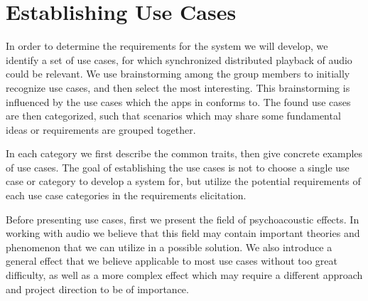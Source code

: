 \chapter{Establishing Use Cases}
\label{cha:establishing_use_cases}
In order to determine the requirements for the system we will develop, we identify a set of use cases, for which synchronized distributed playback of audio could be relevant.
We use brainstorming among the group members to initially recognize use cases, and then select the most interesting.
This brainstorming is influenced by the use cases which the apps in  conforms to.
The found use cases are then categorized, such that scenarios which may share some fundamental ideas or requirements are grouped together.

In each category we first describe the common traits, then give concrete examples of use cases.
The goal of establishing the use cases is not to choose a single use case or category to develop a system for, but utilize the potential requirements of each use case categories in the requirements elicitation.

Before presenting use cases, first we present the field of psychoacoustic effects.
In working with audio we believe that this field may contain important theories and phenomenon that we can utilize in a possible solution.
We also introduce a general effect that we believe applicable to most use cases without too great difficulty, as well as a more complex effect which may require a different approach and project direction to be of importance.
